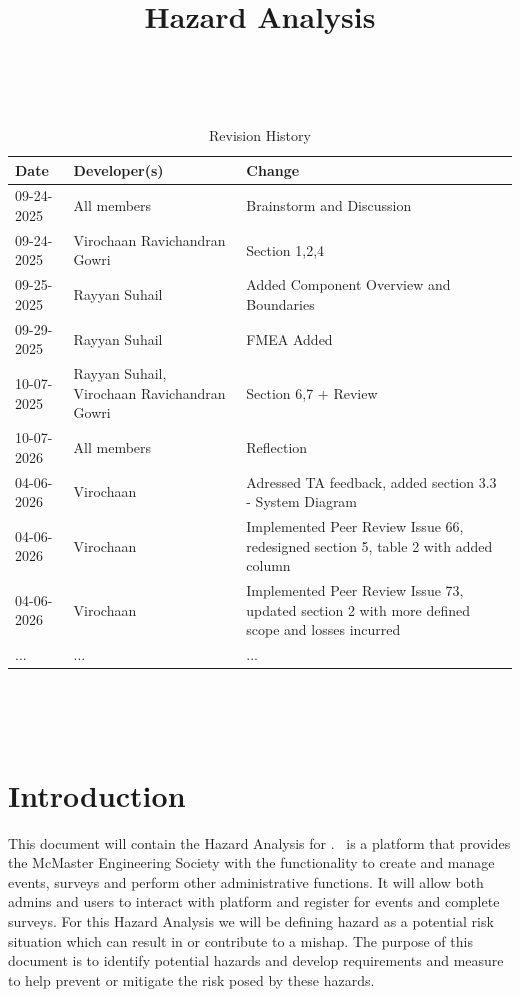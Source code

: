 \documentclass[12pt]{article}
\title{Hazard Analysis\\\progname}
\author{\authname}
\date{}
\begin{document}
\RaggedRight

\maketitle
\thispagestyle{empty}

~\newpage


\begin{table}[hp]
\caption{Revision History} \label{TblRevisionHistory}
\begin{tabularx}{\textwidth}{llX}
\toprule
\textbf{Date} & \textbf{Developer(s)} & \textbf{Change}\\
\midrule
09-24-2025 & All members & Brainstorm and Discussion\\
09-24-2025 & Virochaan Ravichandran Gowri & Section 1,2,4\\
09-25-2025 & Rayyan Suhail & Added Component Overview and Boundaries\\
09-29-2025 & Rayyan Suhail & FMEA Added\\
10-07-2025 & Rayyan Suhail, Virochaan Ravichandran Gowri  & Section 6,7 + Review\\
10-07-2026 & All members & Reflection\\
04-06-2026 & Virochaan & Adressed TA feedback, added section 3.3 - System Diagram\\
04-06-2026 & Virochaan & Implemented Peer Review Issue 66, redesigned section 5, table 2 with added column\\
04-06-2026 & Virochaan & Implemented Peer Review Issue 73, updated section 2 with more defined scope and losses incurred\\
... & ... & ...\\
\bottomrule
\end{tabularx}
\end{table}

~\newpage

\tableofcontents

~\newpage

\section{Introduction}
This document will contain the Hazard Analysis for \teamname. \teamname \ is a platform that provides the McMaster Engineering Society with the functionality to create and manage events, surveys and perform other administrative functions. It will allow both admins and users to interact with platform and register for events and complete surveys. For this Hazard Analysis we will be defining hazard as a potential risk situation which can result in or contribute to a mishap. The purpose of this document is to identify potential hazards and develop requirements and measure to help prevent or mitigate the risk posed by these hazards.
\end{document}
